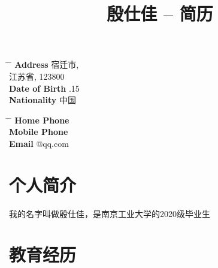 \documentclass[UTF8]{ctexart}
\begin{document}
\title{殷仕佳 -- 简历} %


\parbox{0.5\textwidth}{ %
\begin{tabbing} %
\hspace{3cm} \= \hspace{4cm} \= \kill %
{\bf Address} \>  宿迁市,\\ %
\> 江苏省, 123800 \\ %
{\bf Date of Birth} .15 \\ %
{\bf Nationality} \> 中国 %
\end{tabbing}}
\hfill %
\parbox{0.5\textwidth}{ %
\begin{tabbing} %
\hspace{3cm} \= \hspace{4cm} \= \kill %
{\bf Home Phone}  \\ %
{\bf Mobile Phone}  \\ %
{\bf Email} @qq.com \\ %
\end{tabbing}}


\section{个人简介}
我的名字叫做殷仕佳，是南京工业大学的2020级毕业生

\section{教育经历}

\end{document}
